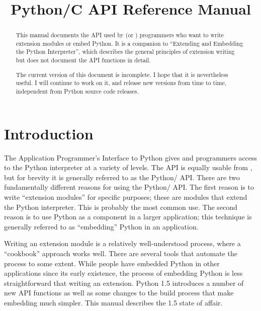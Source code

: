 \documentclass[twoside,openright]{report}
\title{Python/C API Reference Manual}
\begin{document}
\pagestyle{empty}

\maketitle



\begin{abstract}

\noindent
This manual documents the API used by \C{} (or \Cpp{}) programmers who want
to write extension modules or embed Python.  It is a companion to
``Extending and Embedding the Python Interpreter'', which describes
the general principles of extension writing but does not document the
API functions in detail.

 The current version of this document is incomplete.
I hope that it is nevertheless useful.  I will continue to work on it,
and release new versions from time to time, independent from Python
source code releases.

\end{abstract}

\tableofcontents



\chapter{Introduction}

The Application Programmer's Interface to Python gives \C{} and \Cpp{}
programmers access to the Python interpreter at a variety of levels.
The API is equally usable from \Cpp{}, but for brevity it is generally
referred to as the Python/\C{} API.  There are two fundamentally
different reasons for using the Python/\C{} API.  The first reason is to
write ``extension modules'' for specific purposes; these are \C{} modules
that extend the Python interpreter.  This is probably the most common
use.  The second reason is to use Python as a component in a larger
application; this technique is generally referred to as ``embedding''
Python in an application.

Writing an extension module is a relatively well-understood process, 
where a ``cookbook'' approach works well.  There are several tools 
that automate the process to some extent.  While people have embedded 
Python in other applications since its early existence, the process of 
embedding Python is less straightforward that writing an extension.  
Python 1.5 introduces a number of new API functions as well as some 
changes to the build process that make embedding much simpler.  
This manual describes the 1.5 state of affair.
\end{document}
